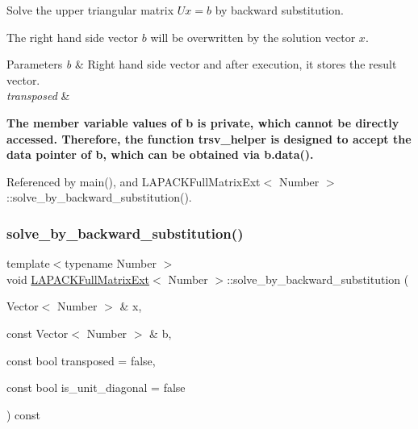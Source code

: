 Solve the upper triangular matrix $Ux=b$ by backward substitution.

The right hand side vector $b$ will be overwritten by the solution vector $x$.


\begin{DoxyParams}{Parameters}
{\em b} & Right hand side vector and after execution, it stores the result vector. \\
\hline
{\em transposed} & \\
\hline
\end{DoxyParams}
{\bfseries The member variable {\ttfamily values} of {\ttfamily b} is private, which cannot be directly accessed. Therefore, the function {\ttfamily trsv\+\_\+helper} is designed to accept the data pointer of {\ttfamily b}, which can be obtained via {\ttfamily b.\+data()}.}

Referenced by main(), and L\+A\+P\+A\+C\+K\+Full\+Matrix\+Ext$<$ Number $>$\+::solve\+\_\+by\+\_\+backward\+\_\+substitution().

\mbox{\label{classLAPACKFullMatrixExt_ac81fbff25894b934408d8329c953ba5a}} 
\subsubsection{\texorpdfstring{solve\+\_\+by\+\_\+backward\+\_\+substitution()}{solve\_by\_backward\_substitution()}\hspace{0.1cm}{\footnotesize\ttfamily [2/2]}}
{\footnotesize\ttfamily template$<$typename Number $>$ \\
void \hyperlink{classLAPACKFullMatrixExt}{L\+A\+P\+A\+C\+K\+Full\+Matrix\+Ext}$<$ Number $>$\+::solve\+\_\+by\+\_\+backward\+\_\+substitution (\begin{DoxyParamCaption}\item[{Vector$<$ Number $>$ \&}]{x,  }\item[{const Vector$<$ Number $>$ \&}]{b,  }\item[{const bool}]{transposed = {\ttfamily false},  }\item[{const bool}]{is\+\_\+unit\+\_\+diagonal = {\ttfamily false} }\end{DoxyParamCaption}) const}

